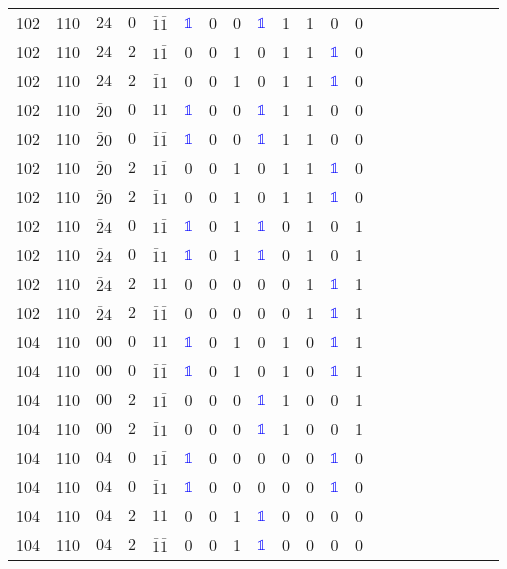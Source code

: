 \begin{longtable*}{c| cccccccccccccccccccc }
102& 110& $24$& $0$& $\bar{1}\bar{1}$& \textcolor{blue}{$\mathds{1}$}& 0& 0& \textcolor{blue}{$\mathds{1}$}& 1& 1& 0& 0\\
102& 110& $24$& $2$& $1\bar{1}$& 0& 0& 1& 0& 1& 1& \textcolor{blue}{$\mathds{1}$}& 0\\
102& 110& $24$& $2$& $\bar{1}1$& 0& 0& 1& 0& 1& 1& \textcolor{blue}{$\mathds{1}$}& 0\\
102& 110& $\bar{2}0$& $0$& $11$& \textcolor{blue}{$\mathds{1}$}& 0& 0& \textcolor{blue}{$\mathds{1}$}& 1& 1& 0& 0\\
102& 110& $\bar{2}0$& $0$& $\bar{1}\bar{1}$& \textcolor{blue}{$\mathds{1}$}& 0& 0& \textcolor{blue}{$\mathds{1}$}& 1& 1& 0& 0\\
102& 110& $\bar{2}0$& $2$& $1\bar{1}$& 0& 0& 1& 0& 1& 1& \textcolor{blue}{$\mathds{1}$}& 0\\
102& 110& $\bar{2}0$& $2$& $\bar{1}1$& 0& 0& 1& 0& 1& 1& \textcolor{blue}{$\mathds{1}$}& 0\\
102& 110& $\bar{2}4$& $0$& $1\bar{1}$& \textcolor{blue}{$\mathds{1}$}& 0& 1& \textcolor{blue}{$\mathds{1}$}& 0& 1& 0& 1\\
102& 110& $\bar{2}4$& $0$& $\bar{1}1$& \textcolor{blue}{$\mathds{1}$}& 0& 1& \textcolor{blue}{$\mathds{1}$}& 0& 1& 0& 1\\
102& 110& $\bar{2}4$& $2$& $11$& 0& 0& 0& 0& 0& 1& \textcolor{blue}{$\mathds{1}$}& 1\\
102& 110& $\bar{2}4$& $2$& $\bar{1}\bar{1}$& 0& 0& 0& 0& 0& 1& \textcolor{blue}{$\mathds{1}$}& 1\\
104& 110& $00$& $0$& $11$& \textcolor{blue}{$\mathds{1}$}& 0& 1& 0& 1& 0& \textcolor{blue}{$\mathds{1}$}& 1\\
104& 110& $00$& $0$& $\bar{1}\bar{1}$& \textcolor{blue}{$\mathds{1}$}& 0& 1& 0& 1& 0& \textcolor{blue}{$\mathds{1}$}& 1\\
104& 110& $00$& $2$& $1\bar{1}$& 0& 0& 0& \textcolor{blue}{$\mathds{1}$}& 1& 0& 0& 1\\
104& 110& $00$& $2$& $\bar{1}1$& 0& 0& 0& \textcolor{blue}{$\mathds{1}$}& 1& 0& 0& 1\\
104& 110& $04$& $0$& $1\bar{1}$& \textcolor{blue}{$\mathds{1}$}& 0& 0& 0& 0& 0& \textcolor{blue}{$\mathds{1}$}& 0\\
104& 110& $04$& $0$& $\bar{1}1$& \textcolor{blue}{$\mathds{1}$}& 0& 0& 0& 0& 0& \textcolor{blue}{$\mathds{1}$}& 0\\
104& 110& $04$& $2$& $11$& 0& 0& 1& \textcolor{blue}{$\mathds{1}$}& 0& 0& 0& 0\\
104& 110& $04$& $2$& $\bar{1}\bar{1}$& 0& 0& 1& \textcolor{blue}{$\mathds{1}$}& 0& 0& 0& 0\\

\end{longtable*}

